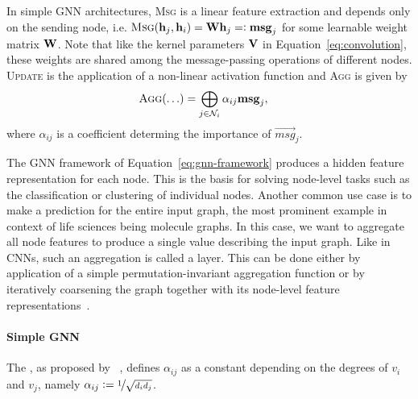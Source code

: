 \documentclass[
	fontsize=10pt, %
	twoside=true, %
	secnumdepth=1, %
  toc=indentunnumbered %
]{kaobook}
\begin{document}
In simple GNN architectures, \textsc{Msg} is a linear feature extraction and depends
only on the sending node, i.e. $\textsc{Msg}(\vec h_j, \vec h_i) = 
\mat W \vec h_j =: \msg_j$ for some learnable weight matrix $\mat W$. Note that
like the kernel parameters $\mat V$ in Equation~\ref{eq:convolution}, these weights are
shared among the message-passing operations of different nodes.
% 
\textsc{Update} is the application of a non-linear activation function and
\textsc{Agg} is given by
\begin{align*}
  & \textsc{Agg}(\ldots) = \bigoplus_{j \in \mathcal{N}_i} \alpha_{ij} \vec{msg}_j,
\end{align*} where $\alpha_{ij}$ is a coefficient determing the importance of
$\vec{msg}_{j}$.


The GNN framework of Equation~\ref{eq:gnn-framework} produces a hidden feature representation
for each node. This is the basis for solving node-level tasks such as the
classification or clustering of individual nodes. Another common use case is to
make a prediction for the entire input graph, the most prominent example in
context of life sciences being molecule graphs. In this case, we want to
aggregate all node features to produce a single value describing the input
graph. Like in CNNs, such an aggregation is called a  layer. This
can be done either by application of a simple permutation-invariant aggregation
function or by iteratively coarsening the graph together with its node-level
feature representations~\cite{ying_hierarchical_2019}. 


\paragraph{Simple GNN} The , as
proposed by \citeauthor{kipf_semi-supervised_2017}~\cite{kipf_semi-supervised_2017}, defines $\alpha_{ij}$ as a constant depending
on the degrees of $v_i$ and $v_j$, namely $\alpha_{ij} := \nicefrac{1}{\sqrt{d_i
    d_j}}$.
\end{document}
